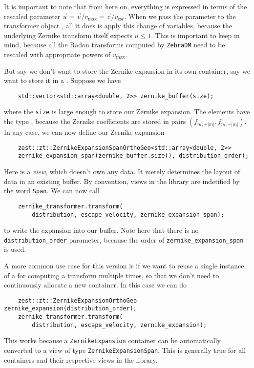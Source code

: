 \documentclass{article}
\begin{document}
It is important to note that from here on, everything is expressed in terms of the rescaled parameter $\vec{u}=\vec{v}/v_\text{max}=\vec{v}/v_\text{esc}$. When we pass the parameter  to the transformer object , all it does is apply this change of variables, because the underlying Zernike transform itself expects $u\leq1$. This is important to keep in mind, because all the Radon transforms computed by \texttt{ZebraDM} need to be rescaled with appropriate powers of $v_\text{max}$.

But say we don't want to store the Zernike expansion in its own container, say we want to store it in a . Suppose we have 
\begin{verbatim}
    std::vector<std::array<double, 2>> zernike_buffer(size);
\end{verbatim}
where the \texttt{size} is large enough to store our Zernike expansion. The elements have the type , because the Zernike coefficients are stored in pairs $(f_{nl,+|m|},f_{nl,-|m|})$. In any case, we can now define our Zernike expansion
\begin{verbatim}
    zest::zt::ZernikeExpansionSpanOrthoGeo<std::array<double, 2>>
    zernike_expansion_span(zernike_buffer.size(), distribution_order);
\end{verbatim}
Here  is a \emph{view}, which doesn't own any data. It merely determines the layout of data in an existing buffer. By convention, views in the library are indetified by the word \texttt{Span}. We can now call
\begin{verbatim}
    zernike_transformer.transform(
        distribution, escape_velocity, zernike_expansion_span);
\end{verbatim}
to write the expansion into our buffer. Note here that there is no \texttt{distribution\_order} parameter, because the order of \texttt{zernike\_expansion\_span} is used.

A more common use case for this version is if we want to reuse a single instance of a  for computing a transform multiple times, so that we don't need to continuously allocate a new container. In this case we can do
\begin{verbatim}
    zest::zt::ZernikeExpansionOrthoGeo zernike_expansion(distribution_order);
    zernike_transformer.transform(
        distribution, escape_velocity, zernike_expansion);
\end{verbatim}
This works because a \texttt{ZernikeExpansion} container can be automatically converted to a view of type \texttt{ZernikeExpansionSpan}. This is generally true for all containers and their respective views in the library.
\end{document}
